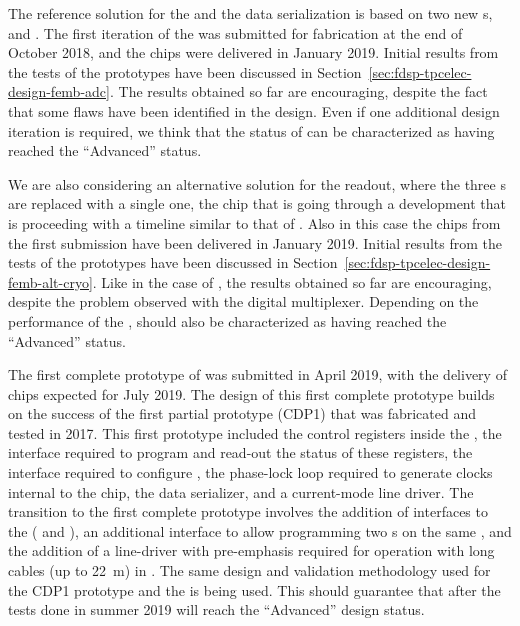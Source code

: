 The reference solution for the  and the data serialization is based on two new 
s,  and .
The first iteration of the  was submitted for fabrication
at the end of October 2018, and the chips were delivered in January 2019.
Initial results from the tests of the  prototypes have
been discussed in Section~\ref{sec:fdsp-tpcelec-design-femb-adc}. The
results obtained so far are encouraging, despite the fact that some
flaws have been identified in the design. Even if one additional design
iteration is required, we think that the status of  can
be characterized as having reached the ``Advanced'' status.

We are also considering an alternative solution for the readout, where
the three s are replaced with a single one, the 
chip that is going through a development that is proceeding with a 
timeline similar to that of . Also in this case the
chips from the first submission have been delivered in January 2019.
Initial results from the tests of the  prototypes have
been discussed in Section~\ref{sec:fdsp-tpcelec-design-femb-alt-cryo}.
Like in the case of , the results obtained so far are
encouraging, despite the problem observed with the digital multiplexer.
Depending on the performance of the ,  should
also be characterized as having reached the ``Advanced'' status.

The first complete prototype of  was submitted in 
April 2019, with the delivery of chips expected for July 2019.
The design of this first complete prototype builds on the success of
the first partial prototype (CDP1) that was fabricated and tested in 2017.
This first prototype included the control registers inside the 
, the  interface required to program and read-out
the status of these registers, the  interface required to
configure , the phase-lock loop required to generate
clocks internal to the chip, the data serializer, and a current-mode
line driver. The transition to the first complete prototype
involves the addition of interfaces to the  (
and ), an additional  interface to allow programming two
 s on the same , and the
addition of a line-driver with pre-emphasis required for operation
with long cables (up to \SI{22}{m}) in \lar. The same design and
validation methodology used for the CDP1 prototype and the 
is being used. This should guarantee that after the tests done in
summer 2019  will reach the ``Advanced'' design 
status. 

